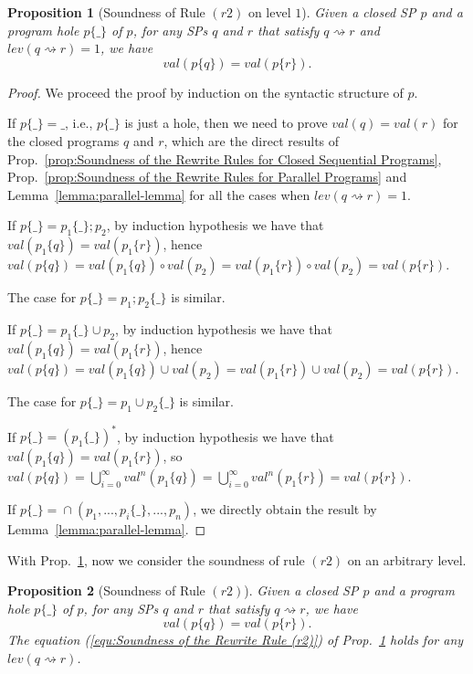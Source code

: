 \documentclass{fcs}
\newtheorem{prop}{Proposition}[section]
\newcommand{\val}[0]{\mathit{val}}
\DeclareMathOperator{\seq}{;}
\DeclareMathOperator{\para}{\cap}
\newcommand{\place}[0]{\_}
\newcommand{\red}[0]{\rightsquigarrow}
\newcommand{\lev}[0]{\mathit{lev}}
\begin{document}
\begin{prop}[Soundness of Rule $(r2)$ on level $1$]
    \label{prop:Soundness of the Rewrite Rule (r2) on level 1}
    Given a closed SP $p$ and a program hole $p\{\place\}$ of $p$, for any SPs $q$ and $r$ that satisfy $q\red r$ and $\lev(q\red r) = 1$, we have
    \begin{equation}
    \label{equ:Soundness of the Rewrite Rule (r2)}
    \val(p\{q\}) = \val(p\{r\}).
    \end{equation}
\end{prop}
\begin{proof}
    We proceed the proof by induction on the syntactic structure of $p$.

    If $p\{\place\} = \place$, i.e., $p\{\place\}$ is just a hole, then we need to prove $\val(q) = \val(r)$ for the closed programs $q$ and $r$, which are the direct results of Prop.~\ref{prop:Soundness of the Rewrite Rules for Closed Sequential Programs}, Prop.~\ref{prop:Soundness of the Rewrite Rules for Parallel Programs} and Lemma~\ref{lemma:parallel-lemma} for all the cases when $\lev(q\red r) = 1$.

    If $p\{\place\} = p_1\{\place\}\seq p_2$, by induction hypothesis we have that $\val(p_1\{q\}) = \val(p_1\{r\})$, hence $\val(p\{q\}) = \val(p_1\{q\})\circ \val(p_2) = \val(p_1\{r\})\circ \val(p_2) = \val(p\{r\})$.

    The case for $p\{\place\} = p_1\seq p_2\{\place\}$ is similar.

    If $p\{\place\} = p_1\{\place\}\cup p_2$, by induction hypothesis we have that $\val(p_1\{q\}) = \val(p_1\{r\})$, hence $\val(p\{q\}) = \val(p_1\{q\})\cup \val(p_2) = \val(p_1\{r\})\cup \val(p_2) = \val(p\{r\})$.

    The case for $p\{\place\} = p_1\cup p_2\{\place\}$ is similar.

    If $p\{\place\} = (p_1\{\place\})^*$, by induction hypothesis we have that $\val(p_1\{q\}) = \val(p_1\{r\})$, so $\val(p\{q\}) = \bigcup^\infty_{i=0}\val^n(p_1\{q\}) = \bigcup^\infty_{i=0}\val^n(p_1\{r\}) = \val(p\{r\})$.

    If $p\{\place\} = \para(p_1,...,p_i\{\place\},...,p_n)$, we directly obtain the result by Lemma~\ref{lemma:parallel-lemma}.
\end{proof}

With Prop.~\ref{prop:Soundness of the Rewrite Rule (r2) on level 1}, now we consider the soundness of rule $(r2)$ on an arbitrary level.

\begin{prop}[Soundness of Rule $(r2)$]
\label{prop:Soundness of the Rewrite Rule r2}
\ifx
    Given a closed SP $p$ and a program hole $p\{\place\}$ of $p$, for any SPs $q$ and $r$ that satisfy $q\red r$, we have
    \begin{equation}
    \label{equ:Soundness of the Rewrite Rule (r2)}
    \val(p\{q\}) = \val(p\{r\}).
    \end{equation}
\fi
    The equation (\ref{equ:Soundness of the Rewrite Rule (r2)}) of Prop.~\ref{prop:Soundness of the Rewrite Rule (r2) on level 1} holds for any $\lev(q\red r)$.
\end{prop}
\end{document}
